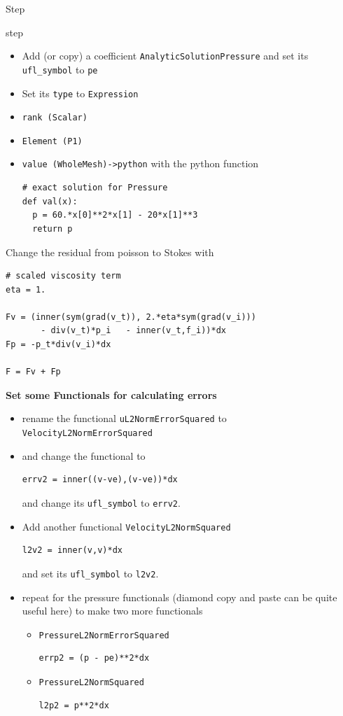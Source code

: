 \begin{steps}{Step}
\begin{steps}{step}
\begin{itemize}
    \item Add (or copy) a coefficient
      \texttt{AnalyticSolutionPressure} and set its
      \texttt{ufl\_symbol} to \texttt{pe}
    \item Set its \texttt{type} to \texttt{Expression}
    \item \texttt{rank (Scalar)}
    \item \texttt{Element (P1)}
    \item \texttt{value (WholeMesh)->python} with the python function
      \begin{lstlisting}[style=Python]
# exact solution for Pressure
def val(x):
  p = 60.*x[0]**2*x[1] - 20*x[1]**3
  return p
      \end{lstlisting}
    \end{itemize}
  \item Change the residual from poisson to Stokes with
    \begin{lstlisting}[style=UFL]
# scaled viscosity term
eta = 1.

Fv = (inner(sym(grad(v_t)), 2.*eta*sym(grad(v_i))) 
       - div(v_t)*p_i   - inner(v_t,f_i))*dx
Fp = -p_t*div(v_i)*dx

F = Fv + Fp
    \end{lstlisting}
  \item\textbf{ Set some Functionals for calculating errors}
 \begin{itemize}
 \item rename the functional \texttt{uL2NormErrorSquared} to \texttt{VelocityL2NormErrorSquared} 
    \item and change  the functional to
      \begin{lstlisting}[style=Ufl]
        errv2 = inner((v-ve),(v-ve))*dx
      \end{lstlisting}
      and change its \texttt{ufl\_symbol} to \texttt{errv2}.
    \item Add another functional \texttt{VelocityL2NormSquared}
      \begin{lstlisting}[style=Ufl]
        l2v2 = inner(v,v)*dx
      \end{lstlisting}
      and set its \texttt{ufl\_symbol} to \texttt{l2v2}.
    \item repeat for the pressure functionals (diamond copy and paste can be
      quite useful here) to make two more functionals
      \begin{itemize}
      \item \texttt{PressureL2NormErrorSquared}
        \begin{lstlisting}[style=Ufl]
        errp2 = (p - pe)**2*dx
      \end{lstlisting}
    \item \texttt{PressureL2NormSquared}
        \begin{lstlisting}[style=Ufl]
        l2p2 = p**2*dx
      \end{lstlisting}
      \end{itemize}


\end{itemize}
\end{steps}
\end{steps}

